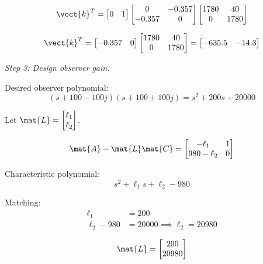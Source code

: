 \begin{equation}
\vect{k}^T = \begin{bmatrix} 0 & 1 \end{bmatrix}
\begin{bmatrix} 0 & -0.357 \\ -0.357 & 0 \end{bmatrix}
\begin{bmatrix} 1780 & 40 \\ 0 & 1780 \end{bmatrix}
\end{equation}

\begin{equation}
\vect{k}^T = \begin{bmatrix} -0.357 & 0 \end{bmatrix}
\begin{bmatrix} 1780 & 40 \\ 0 & 1780 \end{bmatrix}
= \begin{bmatrix} -635.5 & -14.3 \end{bmatrix}
\end{equation}

\textit{Step 3: Design observer gain.}

Desired observer polynomial:
\begin{equation}
(s+100-100j)(s+100+100j) = s^2 + 200s + 20000
\end{equation}

Let $\mat{L} = \begin{bmatrix} \ell_1 \\ \ell_2 \end{bmatrix}$.

\begin{equation}
\mat{A} - \mat{L}\mat{C} = \begin{bmatrix} -\ell_1 & 1 \\ 980-\ell_2 & 0 \end{bmatrix}
\end{equation}

Characteristic polynomial:
\begin{equation}
s^2 + \ell_1 s + \ell_2 - 980
\end{equation}

Matching:
\begin{align}
\ell_1 &= 200 \\
\ell_2 - 980 &= 20000 \implies \ell_2 = 20980
\end{align}

\begin{equation}
\mat{L} = \begin{bmatrix} 200 \\ 20980 \end{bmatrix}
\end{equation}

